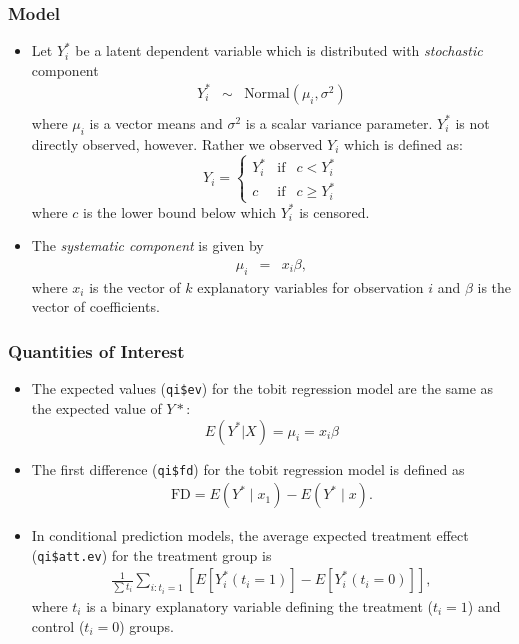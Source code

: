 \subsubsection{Model}
\begin{itemize} 
\item Let $Y_i^*$ be a latent dependent variable which is distributed with
\emph{stochastic} component
\begin{eqnarray*}
Y_i^* & \sim & \textrm{Normal}(\mu_i, \sigma^2) \\
\end{eqnarray*}
where $\mu_i$ is a vector means and $\sigma^2$ is a scalar variance
parameter.  $Y_i^*$ is not directly observed, however.  Rather we
observed $Y_i$ which is defined as:  
\begin{equation*}
Y_i = \left\{
\begin{array}{lcl}
Y_i^*  &\textrm{if} & c <Y_i^* \\
c    &\textrm{if} & c \ge Y_i^* 
\end{array}\right.
\end{equation*}
where $c$ is the lower bound below which $Y_i^*$ is censored.

\item The \emph{systematic component} is given by
\begin{eqnarray*}
\mu_{i} &=& x_{i} \beta,
\end{eqnarray*}
where $x_{i}$ is the vector of $k$ explanatory variables for
observation $i$ and $\beta$ is the vector of coefficients.
\end{itemize}

\subsubsection{Quantities of Interest}

\begin{itemize}
\item The expected values (\texttt{qi\$ev}) for the tobit regression
model are the same as the expected value of $Y*$:  
\begin{equation*}
E(Y^* | X) = \mu_{i} = x_{i} \beta
\end{equation*}

\item The first difference (\texttt{qi\$fd}) for the tobit regression
model is defined as
\begin{eqnarray*}
\text{FD}=E(Y^* \mid x_{1}) - E(Y^* \mid x).
\end{eqnarray*}

\item In conditional prediction models, the average expected treatment effect
(\texttt{qi\$att.ev}) for the treatment group is
\begin{eqnarray*}
\frac{1}{\sum t_{i}}\sum_{i:t_{i}=1}[E[Y^*_{i}(t_{i}=1)]-E[Y^*_{i}(t_{i}=0)]],
\end{eqnarray*}
where $t_{i}$ is a binary explanatory variable defining the treatment
($t_{i}=1$) and control ($t_{i}=0$) groups. 

\end{itemize}

